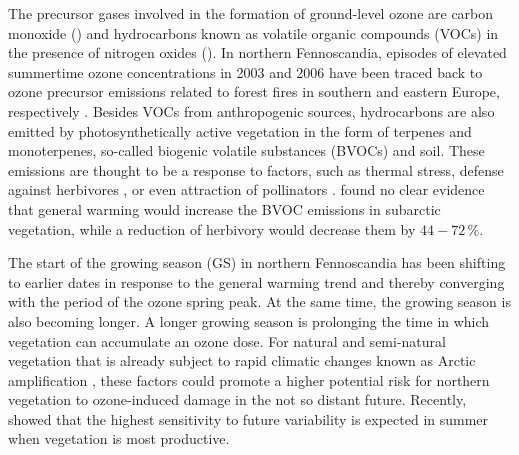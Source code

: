 \documentclass[bg, manuscript]{copernicus}
\begin{document}
The precursor gases involved in the formation of ground-level ozone are carbon monoxide () and hydrocarbons known as volatile organic compounds (VOCs) in the presence of nitrogen oxides (). In northern Fennoscandia, episodes of elevated summertime ozone concentrations in 2003 and 2006 have been traced back to ozone precursor emissions related to forest fires in southern and eastern Europe, respectively \citep{AE:Lindskog2007,EP:Karlsson2013}. 
Besides VOCs from anthropogenic sources, hydrocarbons are also emitted by photosynthetically active vegetation in the form of terpenes and monoterpenes, so-called biogenic volatile substances (BVOCs) and soil. These emissions are thought to be a response to factors, such as thermal stress, defense against herbivores \citep{Ecosystems:Ghimire2021}, or even attraction of pollinators \citep{TPS:Penuelas2003}. \citet{Ecosystems:Ghimire2021} found no clear evidence that general warming would increase the BVOC emissions in subarctic vegetation, while a reduction of herbivory would decrease them by $44-72\,\%$.

The start of the growing season (GS) in northern Fennoscandia has been shifting to earlier dates in response to the general warming trend \citep[e.g.]{GCB:Menzel2006,RS:Hogda2013,IJB:Karlsen2007} and thereby converging with the period of the ozone spring peak. At the same time, the growing season is also becoming longer. A longer growing season is prolonging the time in which vegetation can accumulate an ozone dose. For natural and semi-natural vegetation that is already subject to rapid climatic changes known as Arctic amplification \citep{AMAP2012,IPCC2013}, these factors could promote a higher potential risk for northern vegetation to ozone-induced damage in the not so distant future. Recently, \citet{ESPR:Hayes2021} showed that the highest sensitivity to future \chem{[O_3]} variability is expected in summer when vegetation is most productive.
\end{document}
